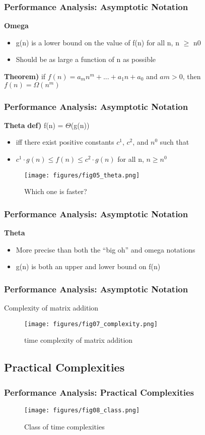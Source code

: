 \documentclass[newPxFont,sthlmFooter,nooffset]{beamer}
\begin{document}
\begin{frame}[t]
  \frametitle{Performance Analysis: Asymptotic Notation}
  \textbf{Omega}
\begin{itemize}
\item g(n) is a lower bound on the value of f(n) for all n, n $\geq$ n0
\item Should be as large a function of n as possible
\end{itemize}
\textbf{Theorem)} if $f(n) = a_mn^m + ... + a_1n + a_0$ and $am > 0$, then $f(n) = \Omega(n^m)$
\end{frame}
\begin{frame}[t]
  \frametitle{Performance Analysis: Asymptotic Notation}
\textbf{Theta}
\textbf{def)} f(n) =  $\Theta$(g(n))
\begin{itemize}
\item iff there exist positive constants $c^1$, $c^2$, and $n^0$ such that
\item $c^1\cdot g(n) \leq f(n) \leq c^2\cdot g(n)$ for all n, $n\geq n^0$
\end{itemize}
\begin{figure}[h]
	\centering
	\texttt{[image: figures/fig05\_theta.png]}
	\caption{Which one is faster?}
\end{figure}

\end{frame}

\begin{frame}[t]
	\frametitle{Performance Analysis: Asymptotic Notation}
	\textbf{  Theta}	
	\begin{itemize}
		\item More precise than both the “big oh” and omega notations
		\item g(n) is both an upper and lower bound on f(n)
	\end{itemize}
	
\end{frame}

\begin{frame}[t]
  \frametitle{Performance Analysis: Asymptotic Notation}
Complexity of matrix addition
  \begin{figure}[h]
    \centering
    \texttt{[image: figures/fig07\_complexity.png]}
    \caption{time complexity of matrix addition}
  \end{figure}
\end{frame}

\subsection{Practical Complexities}
\begin{frame}[t]
  \frametitle{Performance Analysis: Practical Complexities}

  \begin{figure}[h]
    \centering
    \texttt{[image: figures/fig08\_class.png]}
    \caption{Class of time complexities}
  \end{figure}
\end{frame}
\end{document}
